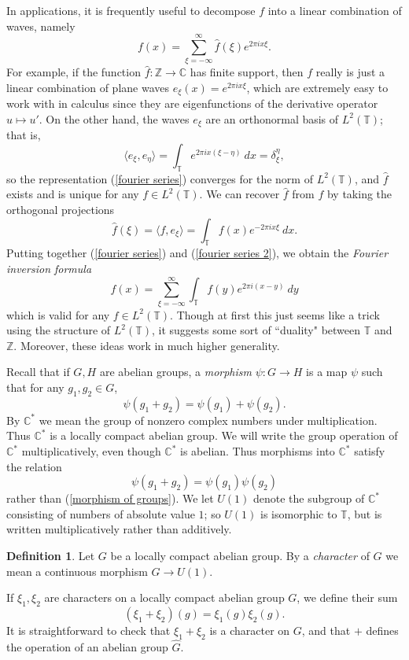 \documentclass[12pt]{book}
\newcommand{\ZZ}{\mathbb{Z}}
\newcommand{\CC}{\mathbb{C}}
\newcommand{\Torus}{\mathbb{T}}
\newcommand{\dfn}[1]{\emph{#1}\index{#1}}
\theoremstyle{definition}
\newtheorem{definition}[theorem]{Definition}
\begin{document}
In applications, it is frequently useful to decompose $f$ into a linear combination of waves, namely
\begin{equation}
\label{fourier series}
f(x) = \sum_{\xi=-\infty}^\infty \hat f(\xi) e^{2\pi ix\xi}.
\end{equation}
For example, if the function $\hat f: \ZZ \to \CC$ has finite support, then $f$ really is just a linear combination of plane waves $e_\xi(x) = e^{2\pi i x\xi}$, which are extremely easy to work with in calculus since they are eigenfunctions of the derivative operator $u \mapsto u'$.
On the other hand, the waves $e_\xi$ are an orthonormal basis of $L^2(\Torus)$; that is,
$$\langle e_\xi, e_\eta\rangle = \int_\Torus e^{2\pi i x(\xi - \eta)} ~dx = \delta_\xi^\eta,$$
so the representation (\ref{fourier series}) converges for the norm of $L^2(\Torus)$, and $\hat f$ exists and is unique for any $f \in L^2(\Torus)$.
We can recover $\hat f$ from $f$ by taking the orthogonal projections
\begin{equation}
\label{fourier series 2}
\hat f(\xi) = \langle f, e_\xi\rangle = \int_\Torus f(x) e^{-2\pi ix\xi} ~dx.
\end{equation}
Putting together (\ref{fourier series}) and (\ref{fourier series 2}), we obtain the \dfn{Fourier inversion formula}
\begin{equation}
\label{fourier series 3}
f(x) = \sum_{\xi = -\infty}^\infty \int_\Torus f(y) e^{2\pi i(x-y)}~dy
\end{equation}
which is valid for any $f \in L^2(\Torus)$. Though at first this just seems like a trick using the structure of $L^2(\Torus)$, it suggests some sort of ``duality" between $\Torus$ and $\ZZ$.
Moreover, these ideas work in much higher generality.

Recall that if $G,H$ are abelian groups, a \dfn{morphism} $\psi: G \to H$ is a map $\psi$ such that for any $g_1, g_2 \in G$,
\begin{equation}
\label{morphism of groups}
\psi(g_1 + g_2) = \psi(g_1) + \psi(g_2).
\end{equation}
By $\CC^*$ we mean the group of nonzero complex numbers under multiplication. Thus $\CC^*$ is a locally compact abelian group.
We will write the group operation of $\CC^*$ multiplicatively, even though $\CC^*$ is abelian. Thus morphisms into $\CC^*$ satisfy the relation
$$\psi(g_1 + g_2) = \psi(g_1)\psi(g_2)$$
rather than (\ref{morphism of groups}).
We let $U(1)$ denote the subgroup of $\CC^*$ consisting of numbers of absolute value $1$; so $U(1)$ is isomorphic to $\Torus$, but is written multiplicatively rather than additively.
\begin{definition}
Let $G$ be a locally compact abelian group.
By a \dfn{character} of $G$ we mean a continuous morphism $G \to U(1)$.
\end{definition}
If $\xi_1, \xi_2$ are characters on a locally compact abelian group $G$, we define their sum
$$(\xi_1 + \xi_2)(g) = \xi_1(g)\xi_2(g).$$
It is straightforward to check that $\xi_1 + \xi_2$ is a character on $G$, and that $+$ defines the operation of an abelian group $\hat G$.
\end{document}
